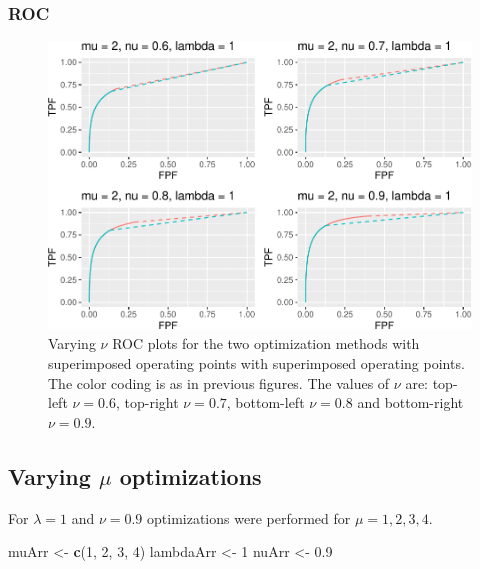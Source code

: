 \documentclass[
]{book}
\newenvironment{Shaded}{\begin{snugshade}}{\end{snugshade}}
\newcommand{\DecValTok}[1]{\textcolor[rgb]{0.00,0.00,0.81}{#1}}
\newcommand{\FloatTok}[1]{\textcolor[rgb]{0.00,0.00,0.81}{#1}}
\newcommand{\KeywordTok}[1]{\textcolor[rgb]{0.13,0.29,0.53}{\textbf{#1}}}
\newcommand{\NormalTok}[1]{#1}
\newcommand{\StringTok}[1]{\textcolor[rgb]{0.31,0.60,0.02}{#1}}
\begin{document}
\hypertarget{roc-3}{%
\subsubsection{ROC}\label{roc-3}}

\begin{figure}
\centering
\includegraphics{21-optim-op-point_files/figure-latex/optim-op-point-vary-nu-roc-1.pdf}
\caption{\label{fig:optim-op-point-vary-nu-roc}Varying \(\nu\) ROC plots for the two optimization methods with superimposed operating points with superimposed operating points. The color coding is as in previous figures. The values of \(\nu\) are: top-left \(\nu = 0.6\), top-right \(\nu = 0.7\), bottom-left \(\nu = 0.8\) and bottom-right \(\nu = 0.9\).}
\end{figure}

\hypertarget{optim-op-point-vary-mu}{%
\subsection{\texorpdfstring{Varying \(\mu\) optimizations}{Varying \textbackslash mu optimizations}}\label{optim-op-point-vary-mu}}

For \(\lambda = 1\) and \(\nu = 0.9\) optimizations were performed for \(\mu = 1, 2, 3, 4\).

\begin{Shaded}
\begin{Highlighting}[]
\NormalTok{muArr <-}\StringTok{ }\KeywordTok{c}\NormalTok{(}\DecValTok{1}\NormalTok{, }\DecValTok{2}\NormalTok{, }\DecValTok{3}\NormalTok{, }\DecValTok{4}\NormalTok{)}
\NormalTok{lambdaArr <-}\StringTok{ }\DecValTok{1}
\NormalTok{nuArr <-}\StringTok{ }\FloatTok{0.9}
\end{Highlighting}
\end{Shaded}
\end{document}
